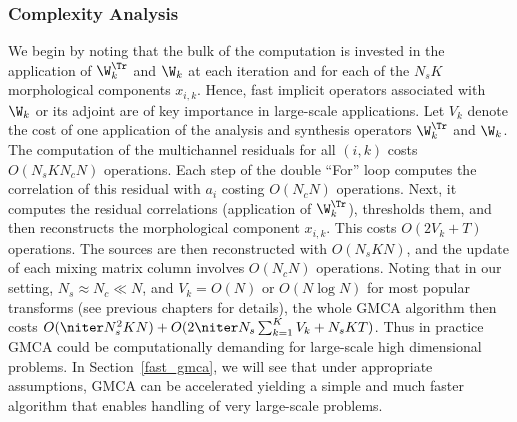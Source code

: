 
\subsubsection{Complexity Analysis}
\label{sec:gmca_cc}
We begin by noting that the bulk of the computation is invested in the application of ${\W}_k^\Tr$ and ${\W}_k$ at each iteration and for each of the $N_sK$ morphological components $x_{i,k}$. Hence, fast implicit operators associated with ${\W}_k$ or its adjoint are of key importance in large-scale applications. Let $V_k$ denote the cost of one application of the analysis and synthesis operators ${\W}_k^\Tr$ and ${\W}_k$. The computation of the multichannel residuals for all $(i,k)$ costs $O(N_s K N_c N)$ operations. Each step of the double ``For'' loop computes the correlation of this residual with $a_i$ costing $O(N_c N)$ operations. Next, it computes the residual correlations (application of ${\W}_k^\Tr$), thresholds them, and then reconstructs the morphological component $x_{i,k}$. This costs $O(2V_k + T)$ operations. The sources are then reconstructed with $O(N_s K N)$, and the update of each mixing matrix column involves $O(N_c N)$ operations. Noting that in our setting, $N_s \approx N_c \ll N$, and $V_k = O(N)$ or $O( N \log N)$ for most popular transforms (see previous chapters for details), the whole GMCA algorithm then costs $O( \niter N_s^2K  N)+O(2\niter N_s \sum_{k=1}^K  V_k + N_s K  T)$. Thus in practice GMCA could be computationally demanding for large-scale high dimensional problems. In Section~\ref{fast_gmca}, we will see that under appropriate assumptions, GMCA can be accelerated yielding a simple and much faster algorithm that enables handling of very large-scale problems.

